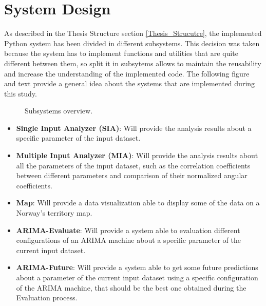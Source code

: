 \newpage

\section{System Design}
\label{System_Design}
As described in the Thesis Structure section \ref{Thesis_Strucutre}, the implemented Python system has been divided in different subsystems. This decision was taken because the system has to implement functions and utilities that are quite different between them, so split it in subsytems allows to maintain the reusability and increase the understanding of the implemented code.
The following figure and text provide a general idea about the systems that are implemented during this study.\\

\begin{figure}[h]
    \caption[Subsystems overview]{Subsystems overview.}
    \label{fig: Subsystems_Overview}
\end{figure}


\begin{itemize}
 \item \textbf{Single Input Analyzer (SIA)}: Will provide the analysis results about a specific parameter of the input dataset.
 \item \textbf{Multiple Input Analyzer (MIA)}: Will provide the analysis results about all the parameters of the input dataset, such as the correlation coefficients between different parameters and comparison of their normalized angular coefficients. 
 \item \textbf{Map}: Will provide a data visualization able to display some of the data on a Norway's territory map.
 \item \textbf{ARIMA-Evaluate}: Will provide a system able to evaluation different configurations of an ARIMA machine about a specific parameter of the current input dataset.
 \item \textbf{ARIMA-Future}: Will provide a system able to get some future predictions about a parameter of the current input dataset using a specific configuration of the ARIMA machine, that should be the best one obtained during the Evaluation process.
\end{itemize} 



